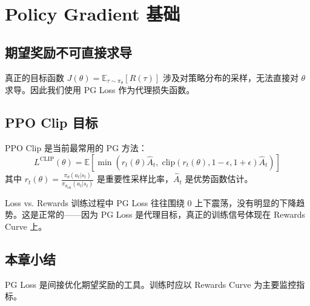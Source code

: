 \section{Policy Gradient 基础}
\subsection{期望奖励不可直接求导}
真正的目标函数 $J(\theta) = \mathbb{E}_{\tau \sim \pi_\theta}[R(\tau)]$ 涉及对策略分布的采样，无法直接对 $\theta$ 求导。因此我们使用 PG Loss 作为代理损失函数。

\subsection{PPO Clip 目标}
PPO Clip 是当前最常用的 PG 方法：
$$L^{\text{CLIP}}(\theta) = \mathbb{E}\left[\min\left(r_t(\theta) \hat{A}_t, \; \text{clip}(r_t(\theta), 1-\epsilon, 1+\epsilon) \hat{A}_t\right)\right]$$
其中 $r_t(\theta) = \frac{\pi_\theta(a_t|s_t)}{\pi_{\theta_{\text{old}}}(a_t|s_t)}$ 是重要性采样比率，$\hat{A}_t$ 是优势函数估计。

\begin{warningbox}{Loss vs. Rewards}
训练过程中 PG Loss 往往围绕 0 上下震荡，没有明显的下降趋势。这是正常的——因为 PG Loss 是代理目标，真正的训练信号体现在 Rewards Curve 上。
\end{warningbox}

\subsection{本章小结}
PG Loss 是间接优化期望奖励的工具。训练时应以 Rewards Curve 为主要监控指标。


